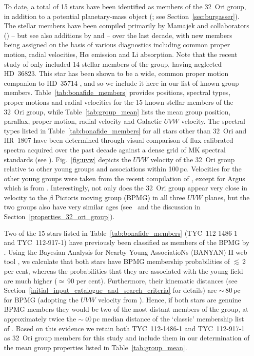 \documentclass[usenatbib]{mnras}
\begin{document}
To date, a total of 15 stars have been identified as members of the
32~Ori group, in addition to a potential planetary-mass object
(\citealp{Burgasser16}; see Section~\ref{sec:burgasser}). The stellar
members have been compiled primarily by Mamajek and collaborators
(\citealp{Mamajek07, Shvonski16}) -- but see also additions by
\cite{Mace09} and \cite{Franciosini11} -- over the last decade, with
new members being assigned on the basis of various diagnostics
including common proper motion, radial velocities, H$\alpha$ emission
and Li absorption. Note that the recent study of \cite*{Bell15} only
included 14 stellar members of the group, having neglected
HD~36823. This star has been shown to be a wide, common proper motion
companion to HD~35714 \citep{Shaya11}, and so we include it here in
our list of known group members. Table~\ref{tab:bonafide_members}
provides positions, spectral types, proper motions and radial
velocities for the 15 known stellar members of the 32~Ori group, while
Table~\ref{tab:group_mean} lists the mean group position, parallax,
proper motion, radial velocity and Galactic $UVW$ velocity. The
spectral types listed in Table~\ref{tab:bonafide_members} for all
stars other than 32~Ori and HR~1807 have been determined
through visual comparison of flux-calibrated spectra acquired over the
past decade against a dense grid of MK spectral standards (see
\citealp{Shvonski16}).
Fig.~\ref{fig:uvw} depicts the $UVW$ velocity of the 32~Ori group
relative to other young groups and associations within
100\,pc. Velocities for the other young groups were taken from the
recent compilation of \cite{Mamajek16}, except for Argus which is from
\cite{Gagne14}. Interestingly, not only does the 32~Ori group appear very
close in velocity to the $\beta$ Pictoris moving group (BPMG) in all three
$UVW$ planes, but the two groups also have very similar ages (see~\citealp{Bell15}
and the discussion in Section~\ref{properties_32_ori_group}).

Two of the 15 stars listed in Table~\ref{tab:bonafide_members}
(TYC~112-1486-1 and TYC~112-917-1) have previously been classified as
members of the BPMG by \cite{Elliott14}. Using the Bayesian Analysis
for Nearby Young AssociatioNs (BANYAN) II web tool
\citep{Gagne14,Malo13}, we calculate that both stars have BPMG
membership probabilities of $\lesssim$\,2 per cent, whereas the
probabilities that they are associated with the young field are much
higher ($\simeq$\,90 per cent). Furthermore, their kinematic distances
(see Section~\ref{initial_input_catalogue_and_search_criteria} for
details) are $\sim$\,80\,pc for BPMG (adopting the $UVW$ velocity from
\citealp{Mamajek16}). Hence, if both stars are genuine BPMG members
they would be two of the most distant members of the group, at
approximately twice the $\sim$\,40\,pc median distance of the `classic'
membership list of \citet[see also
  \citealp{Mamajek14}]{Zuckerman04a}. Based on this evidence we retain
both TYC~112-1486-1 and TYC~112-917-1 as 32~Ori group members for this
study and include them in our determination of the mean group
properties listed in Table~\ref{tab:group_mean}.
\end{document}
